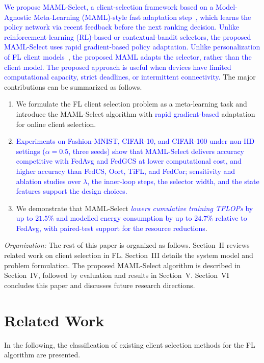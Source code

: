 \documentclass[journal]{IEEEtran}
\newcommand{\revision}[1]{\textcolor{blue}{#1}}
\begin{document}
\revision{We propose MAML-Select, a client-selection framework based on a Model-Agnostic Meta-Learning (MAML)-style fast adaptation step~\cite{finn2017model}, which learns the policy network via recent feedback before the next ranking decision. Unlike reinforcement-learning (RL)-based or contextual-bandit selectors, the proposed MAML-Select uses rapid gradient-based policy adaptation. Unlike personalization of FL client models}~\cite{fallah2020personalized}, \revision{the proposed MAML adapts the selector, rather than the client model. The proposed approach is useful when devices have limited computational capacity, strict deadlines, or intermittent connectivity.} The major contributions can be summarized as follows.
\begin{enumerate}
\setlength{\itemsep}{0pt}
\setlength{\topsep}{1pt}
		\item We formulate the FL client selection problem as a meta-learning task and introduce the MAML-Select algorithm with \revision{rapid gradient-based} adaptation for online client selection.
        \item \revision{Experiments on Fashion-MNIST, CIFAR-10, and CIFAR-100 under non-IID settings ($\alpha = 0.5$, three seeds) show that MAML-Select delivers accuracy competitive with FedAvg and FedGCS at lower computational cost, and higher accuracy than FedCS, Oort, TiFL, and FedCor; sensitivity and ablation studies over $\lambda$, the inner-loop steps, the selector width, and the state features support the design choices.}
		\item We demonstrate that MAML-Select \revision{\textit{lowers cumulative training TFLOPs} by up to $21.5\%$ and modelled energy consumption by up to $24.7\%$ relative to FedAvg, with paired-test support for the resource reductions}.
\end{enumerate}

\textit{Organization:} The rest of this paper is organized as follows. Section~II reviews related work on client selection in FL. Section~III details the system model and problem formulation. The proposed MAML-Select algorithm is described in Section~IV, followed by evaluation and results in Section~V. Section~VI concludes this paper and discusses future research directions.

\section{Related Work}
In the following, the classification of existing client selection methods for the FL algorithm are presented. 
\end{document}
